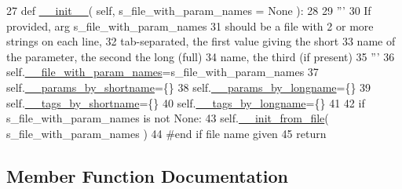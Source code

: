 \begin{DoxyCode}
27     \textcolor{keyword}{def }\hyperlink{classnegui_1_1pgparamset_1_1PGParamSet_a598ea6a166f56fe5be01f86d4d8c91ba}{\_\_init\_\_}( self, s\_file\_with\_param\_names = None ):
28 
29         \textcolor{stringliteral}{'''}
30 \textcolor{stringliteral}{        If provided, arg s\_file\_with\_param\_names}
31 \textcolor{stringliteral}{        should be a file with 2 or more strings on each line,}
32 \textcolor{stringliteral}{        tab-separated, the first value giving the short}
33 \textcolor{stringliteral}{        name of the parameter, the second the long (full)}
34 \textcolor{stringliteral}{        name, the third (if present)}
35 \textcolor{stringliteral}{        '''}
36         self.\hyperlink{classnegui_1_1pgparamset_1_1PGParamSet_aafa67026a09aa523151728cba95e0d6d}{\_\_file\_with\_param\_names}=s\_file\_with\_param\_names
37         self.\hyperlink{classnegui_1_1pgparamset_1_1PGParamSet_a20f20a276c98065fb0e5e00062bd4583}{\_\_params\_by\_shortname}=\{\}
38         self.\hyperlink{classnegui_1_1pgparamset_1_1PGParamSet_a7241c6d2ba9c73f4e09b578bca77a422}{\_\_params\_by\_longname}=\{\}
39         self.\hyperlink{classnegui_1_1pgparamset_1_1PGParamSet_aa13eaff9049bc16fa4090c8b85915f3c}{\_\_tags\_by\_shortname}=\{\}
40         self.\hyperlink{classnegui_1_1pgparamset_1_1PGParamSet_a90505c426805afbad28cd2d3b1df6a6e}{\_\_tags\_by\_longname}=\{\}
41 
42         \textcolor{keywordflow}{if} s\_file\_with\_param\_names \textcolor{keywordflow}{is} \textcolor{keywordflow}{not} \textcolor{keywordtype}{None}:
43             self.\hyperlink{classnegui_1_1pgparamset_1_1PGParamSet_abc19f133ab3ecc86ec8099549b0b45bb}{\_\_init\_from\_file}( s\_file\_with\_param\_names )
44         \textcolor{comment}{#end if file name given}
45         \textcolor{keywordflow}{return}
\end{DoxyCode}


\subsection{Member Function Documentation}
